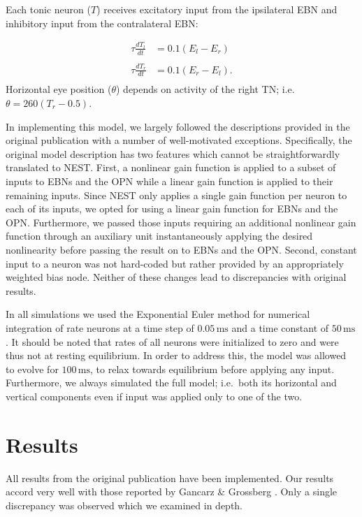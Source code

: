 \documentclass[10pt,a4paper,onecolumn]{article}
\begin{document}
Each tonic neuron (\(T\)) receives excitatory input from the ipsilateral
EBN and inhibitory input from the contralateral EBN:

\[
\begin{array}{ll}
\tau\frac{dT_l}{dt} &= 0.1(E_l-E_r) \\\\
\tau\frac{dT_r}{dt} &= 0.1(E_r-E_l) \textrm{.} \\
\end{array}
\] Horizontal eye position (\(\theta\)) depends on activity of the right
TN; i.e. \(\theta = 260(T_r-0.5)\).

In implementing this model, we largely followed the descriptions
provided in the original publication with a number of well-motivated
exceptions. Specifically, the original model description has two
features which cannot be straightforwardly translated to NEST. First, a
nonlinear gain function is applied to a subset of inputs to EBNs and the
OPN while a linear gain function is applied to their remaining inputs.
Since NEST only applies a single gain function per neuron to each of its
inputs, we opted for using a linear gain function for EBNs and the OPN.
Furthermore, we passed those inputs requiring an additional nonlinear
gain function through an auxiliary unit instantaneously applying the
desired nonlinearity before passing the result on to EBNs and the OPN.
Second, constant input to a neuron was not hard-coded but rather
provided by an appropriately weighted bias node. Neither of these
changes lead to discrepancies with original results.

In all simulations we used the Exponential Euler method for numerical
integration of rate neurons \autocite{Hahne2016} at a time step of
\(0.05\,\mathrm{ms}\) and a time constant of \(50\,\mathrm{ms}\). It
should be noted that rates of all neurons were initialized to zero and
were thus not at resting equilibrium. In order to address this, the
model was allowed to evolve for \(100\,\mathrm{ms}\), to relax towards
equilibrium before applying any input. Furthermore, we always simulated
the full model; i.e.~both its horizontal and vertical components even if
input was applied only to one of the two.

\section{Results}\label{results}

All results from the original publication have been implemented. Our
results accord very well with those reported by Gancarz \& Grossberg
\autocite{Gancarz1998}. Only a single discrepancy was observed which we
examined in depth.
\end{document}
